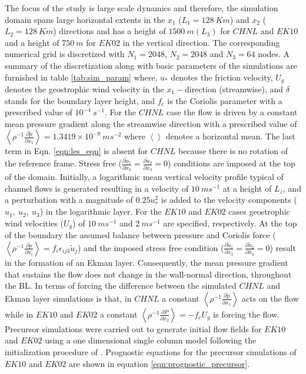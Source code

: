 \documentclass{amsart}
\begin{document}
The focus of the study is large scale dynamics and therefore, the simulation domain spans large horizontal extents in the $x_1$ ($L_{1}=128\ Km$) and $x_2$ ($L_{2}=128\ Km$) directions and has a height of $1500\ m (L_3)$ for $CHNL$ and $EK10$ and a height of $750\ m$ for $EK02$ in the vertical direction. The corresponding numerical grid is discretized with $N_{1}= 2048$, $N_{2}=2048$ and $N_{3}=64$ nodes. A summary of the discretization along with basic parameters of the simulations are furnished in table \ref{tab:sim_param} where, $u_*$ denotes the friction velocity, $U_g$ denotes the geostrophic wind velocity in the $x_1-$direction (streamwise), and $\delta$ stands for the boundary layer height, and $f_c$ is the Coriolis parameter with a prescribed value of $10^{-4}\ s^{-1}$. For the $CHNL$ case the flow is driven by a constant mean pressure gradient along the streamwise direction with a prescribed value of $\left < \rho^{-1} \frac{\partial \tilde{p}}{\partial x_1} \right > = 1.3419\times 10^{-9}\ ms^{-2}$ where $\left <  \right >$ denotes a horizontal mean. The last term in Eqn. \ref{eqn:les_eqn} is absent for $CHNL$ because there is no rotation of the reference frame. Stress free ($\frac{\partial \tilde{u}_1}{\partial x_3}=\frac{\partial \tilde{u}_2}{\partial x_3}=0$) conditions are imposed at the top of the domain. Initially, a logarithmic mean vertical velocity profile typical of channel flows is generated resulting in a velocity of $10\ ms^{-1}$ at a height of $L_z$, and a perturbation with a magnitude of  $0.25 u_*^{2}$ is added to the velocity components ($u_1,\ u_2,\ u_3$) in the logarithmic layer. For the $EK10$ and $EK02$ cases geostrophic wind velocities ($U_{g}$) of $10\ ms^{-1}$ and $2\ ms^{-1}$ are specified, respectively. At the top of the boundary the assumed balance between pressure and Coriolis force ($\left < \rho^{-1}\frac{\partial \tilde{p} }{\partial x_i} \right > = f_c\epsilon_{ij3}\tilde{u}_j$) and the imposed stress free condition ($\frac{\partial \tilde{u}_1}{\partial x_3}=\frac{\partial \tilde{u}_2}{\partial x_3}=0$) result in the formation of an Ekman layer. Consequently,  the mean pressure gradient that sustains the flow does not change in the wall-normal direction, throughout the BL.  In terms of forcing the difference between the simulated $CHNL$ and Ekman layer simulations is that, in $CHNL$ a constant $\left < \rho^{-1} \frac{\partial \tilde{p}}{\partial x_1} \right >$ acts on the flow while in $EK10$ and $EK02$ a constant $\left < \rho^{-1}\frac{\partial P }{\partial x_2} \right >  = -f_c U_g$ is forcing the flow. Precursor simulations were carried out to generate initial flow fields for $EK10$ and $EK02$ using a one dimensional single column model following the initialization procedure of \citet{andren_brown_qjrm_94}. Prognostic equations for the precursor simulations of $EK10$ and $EK02$ are shown in equation \ref{eqn:prognostic_precursor}.
\end{document}

